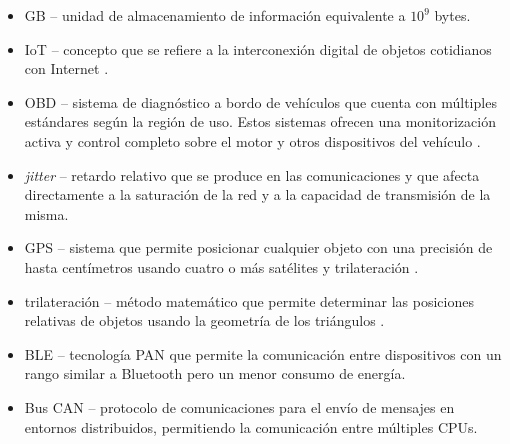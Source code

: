 \begin{acronym}
\end{acronym}

\begin{itemize}
  \item \ac{GB} -- unidad de almacenamiento de información equivalente a $10^9$ bytes.
  \item \ac{IoT} -- concepto que se refiere a la interconexión digital de objetos 
        cotidianos con Internet \cite{InternetCosas2021}.
  \item \ac{OBD} -- sistema de diagnóstico a bordo de vehículos que
        cuenta con múltiples estándares según la región de uso. Estos
        sistemas ofrecen una monitorización activa y control completo
        sobre el motor y otros dispositivos del vehículo \cite{OBD2021}.
  \item \textit{jitter} -- retardo relativo que se produce en las comunicaciones
        y que afecta directamente a la saturación de la red y a la capacidad de
        transmisión de la misma.
  \item \ac{GPS} -- sistema que permite posicionar cualquier objeto con una 
        precisión de hasta centímetros usando cuatro o más satélites y 
        trilateración \cite{GPS2021}.
  \item trilateración -- método matemático que permite determinar las posiciones
        relativas de objetos usando la geometría de los triángulos \cite{Trilateracion2021}.
  \item \ac{BLE} -- tecnología \ac{PAN} que permite la comunicación entre dispositivos
        con un rango similar a Bluetooth pero un menor consumo de energía.
  \item Bus \ac{CAN} -- protocolo de comunicaciones para el envío de
        mensajes en entornos distribuidos, permitiendo la comunicación
        entre múltiples CPUs.
\end{itemize}